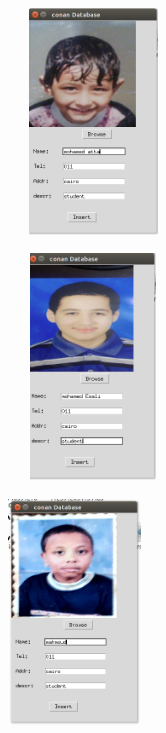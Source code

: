 \documentclass[pdftex,10pt,a4paper,oneside]{article}
\begin{document}
\begin{enumerate}
		\begin{figure}[H]
		\centering
		\includegraphics[width=60mm,height=60mm]{fig/09.png}
	\end{figure}
		\begin{figure}[H]
		\centering
		\includegraphics[width=60mm,height=60mm]{fig/08.png}
	\end{figure}
		\begin{figure}[H]
		\centering
		\includegraphics[width=50mm,height=60mm]{fig/07.png}
	\end{figure}
	\begin{figure}[H]

\end{figure}
\end{enumerate}
\end{document}
